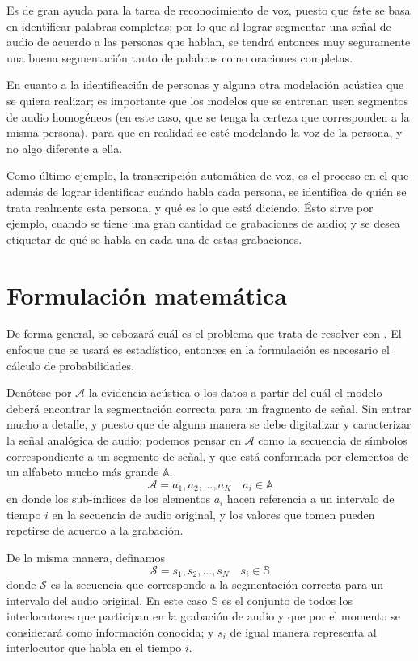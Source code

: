 Es de gran ayuda para la tarea de reconocimiento de voz, puesto que éste se basa en identificar palabras completas; por lo que al lograr segmentar una señal de audio de acuerdo a las personas que hablan, se tendrá entonces muy seguramente una buena segmentación tanto de palabras como oraciones completas.

En cuanto a la identificación de personas y alguna otra modelación acústica que se quiera realizar; es importante que los modelos que se entrenan usen segmentos de audio homogéneos (en este caso, que se tenga la certeza que corresponden a la misma persona), para que en realidad se esté modelando la voz de la persona, y no algo diferente a ella.

Como último ejemplo, la transcripción automática de voz, es el proceso en el que además de lograr identificar cuándo habla cada persona, se identifica de quién se trata realmente esta persona, y qué es lo que está diciendo. Ésto sirve por ejemplo, cuando se tiene una gran cantidad de grabaciones de audio; y se desea etiquetar de qué se habla en cada una de estas grabaciones. 

\section{Formulación matemática}

De forma general, se esbozará cuál es el problema que trata de resolver con \sd. El enfoque que se usará es estadístico, entonces en la formulación es necesario el cálculo de probabilidades. 

Denótese por $\mathcal{A}$ la evidencia acústica o los datos a partir del cuál el modelo deberá encontrar la segmentación correcta para un fragmento de señal. Sin entrar mucho a detalle, y puesto que de alguna manera se debe digitalizar y caracterizar la señal analógica de audio; podemos pensar en $\mathcal{A}$ como la secuencia de símbolos correspondiente a un segmento de señal, y que está conformada por elementos de un alfabeto mucho más grande $\mathbb{A}$. 
\begin{equation}
\mathcal{A} = a_1, a_2, ..., a_K \quad a_i \in \mathbb{A}
\label{eqn:2a-1}
\end{equation}
en donde los sub-índices de los elementos $a_i$ hacen referencia a un intervalo de tiempo $i$ en la secuencia de audio original, y los valores que tomen pueden repetirse de acuerdo a la grabación.

De la misma manera, definamos 
\begin{equation}
\mathcal{S} = s_1, s_2, ..., s_N \quad s_i \in \mathbb{S}
\label{eqn:2a-2}
\end{equation}
donde $\mathcal{S}$ es la secuencia que corresponde a la segmentación correcta para un intervalo del audio original. En este caso $\mathbb{S}$ es el conjunto de todos los interlocutores que participan en la grabación de audio y que por el momento se considerará como información conocida; y $s_i$ de igual manera representa al interlocutor que habla en el tiempo $i$.

